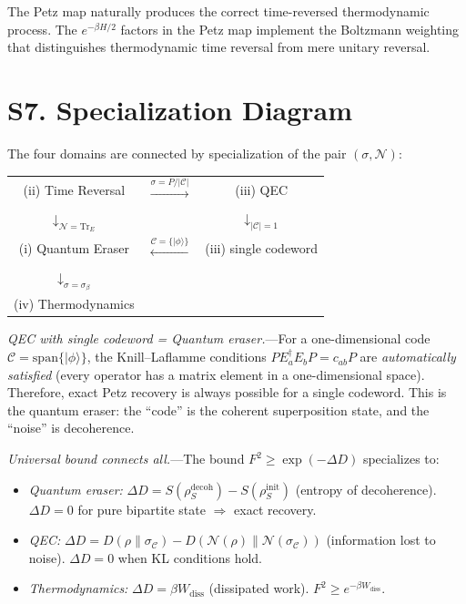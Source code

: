 \documentclass[prl,twocolumn,superscriptaddress,longbibliography]{revtex4-2}
\newcommand{\Tr}{\mathrm{Tr}}
\newcommand{\chan}{\mathcal{N}}
\newcommand{\code}{\mathcal{C}}
\newcommand{\ket}[1]{|#1\rangle}
\begin{document}
The Petz map naturally produces the correct time-reversed thermodynamic
process. The $e^{-\beta H/2}$ factors in the Petz map implement the
Boltzmann weighting that distinguishes thermodynamic time reversal from
mere unitary reversal.

\section{S7. Specialization Diagram}
\label{sec:diagram}

The four domains are connected by specialization of the pair
$(\sigma, \chan)$:

\begin{center}
\begin{tabular}{ccc}
(ii) Time Reversal & $\xrightarrow{\sigma = P/|\code|}$ & (iii) QEC \\
$\downarrow_{\chan = \Tr_E}$ & & $\downarrow_{|\code|=1}$ \\
(i) Quantum Eraser & $\xleftarrow{\code = \{\ket{\phi}\}}$ &
  (iii) single codeword \\
$\downarrow_{\sigma = \sigma_\beta}$ & & \\
(iv) Thermodynamics & &
\end{tabular}
\end{center}

\emph{QEC with single codeword = Quantum eraser.}---For a
one-dimensional code $\code = \mathrm{span}\{\ket{\phi}\}$, the
Knill--Laflamme conditions $P E_a^\dagger E_b P = c_{ab} P$ are
\emph{automatically satisfied} (every operator has a matrix element
in a one-dimensional space). Therefore, exact Petz recovery is always
possible for a single codeword. This is the quantum eraser: the ``code''
is the coherent superposition state, and the ``noise'' is decoherence.

\emph{Universal bound connects all.}---The bound
$F^2 \geq \exp(-\Delta D)$ specializes to:
\begin{itemize}
\item \emph{Quantum eraser:} $\Delta D = S(\rho_S^{\mathrm{decoh}}) -
  S(\rho_S^{\mathrm{init}})$ (entropy of decoherence).
  $\Delta D = 0$ for pure bipartite state $\Rightarrow$ exact recovery.
\item \emph{QEC:} $\Delta D = D(\rho\|\sigma_\code) -
  D(\chan(\rho)\|\chan(\sigma_\code))$ (information lost to noise).
  $\Delta D = 0$ when KL conditions hold.
\item \emph{Thermodynamics:} $\Delta D = \beta W_{\mathrm{diss}}$
  (dissipated work). $F^2 \geq e^{-\beta W_{\mathrm{diss}}}$.
\end{itemize}
\end{document}
